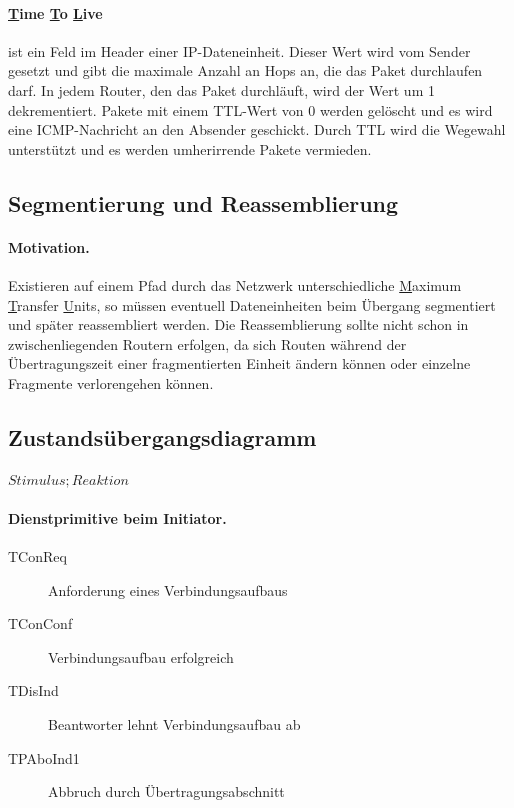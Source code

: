 \documentclass[]{scrartcl}
\begin{document}
\paragraph{\underline{T}ime \underline{T}o \underline{L}ive} ist ein Feld im Header einer IP-Dateneinheit. Dieser Wert wird vom Sender gesetzt und gibt die maximale Anzahl an Hops an, die das Paket durchlaufen darf. In jedem Router, den das Paket durchl\"auft, wird der Wert um 1 dekrementiert. Pakete mit einem TTL-Wert von 0 werden gel\"oscht und es wird eine ICMP-Nachricht an den Absender geschickt. Durch TTL wird die Wegewahl unterst\"utzt und es werden umherirrende Pakete vermieden.

\subsection{Segmentierung und Reassemblierung}

\paragraph{Motivation.} Existieren auf einem Pfad durch das Netzwerk unterschiedliche \underline{M}aximum \underline{T}ransfer \underline{U}nits, so m\"ussen eventuell Dateneinheiten beim \"Ubergang segmentiert und sp\"ater reassembliert werden. Die Reassemblierung sollte nicht schon in zwischenliegenden Routern erfolgen, da sich Routen w\"ahrend der \"Ubertragungszeit einer fragmentierten Einheit \"andern k\"onnen oder einzelne Fragmente verlorengehen k\"onnen.

\subsection{Zustands\"ubergangsdiagramm}

$Stimulus ; Reaktion$

\paragraph{Dienstprimitive beim Initiator.}

\begin{description}
\item[TConReq] Anforderung eines Verbindungsaufbaus
\item[TConConf] Verbindungsaufbau erfolgreich
\item[TDisInd] Beantworter lehnt Verbindungsaufbau ab
\item[TPAboInd1] Abbruch durch \"Ubertragungsabschnitt
\end{description}
\end{document}
